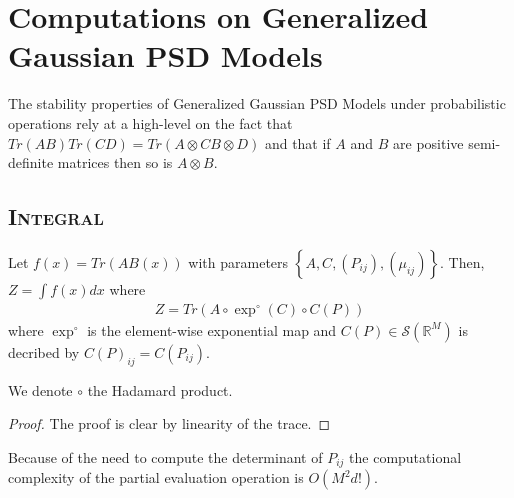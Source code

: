 \section{Computations on Generalized Gaussian PSD Models}\label{sec:proof-ops}
The stability properties of Generalized Gaussian PSD Models under probabilistic operations rely at a high-level on the fact that $Tr(AB)Tr(CD)=Tr(A\otimes C B \otimes D)$ and that if $A$ and $B$ are positive semi-definite matrices then so is $A\otimes B$.

\subsection{\textsc{Integral}}
\begin{proposition}
   Let $f(x) = Tr(AB(x))$ with parameters $\left\lbrace A, C, (P_{ij}), (\mu_{ij})\right\rbrace$. Then, $Z =\int f(x)dx$ where
   \begin{align}
       Z = Tr(A \circ \exp^\circ(C) \circ C(P))
   \end{align}
   where $\exp^\circ$ is the element-wise exponential map and $C(P)\in\mathcal S(\mathbb R^M)$ is decribed by $C(P)_{ij}=C(P_{ij})$.
\end{proposition}
We denote $\circ$ the Hadamard product.
\begin{proof}
The proof is clear by linearity of the trace.
\end{proof}
\begin{remark}
Because of the need to compute the determinant of $P_{ij}$ the computational complexity of the partial evaluation operation is $O(M^2 d!)$.
\end{remark}
